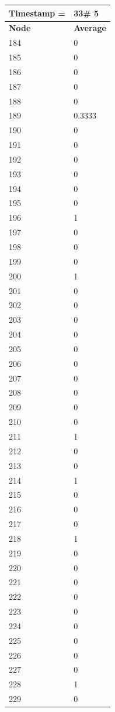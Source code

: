 \begin{tabular}{|l||l|}
\hline
\textbf{Timestamp =} & \textbf{33}\# 5\\\hline
	\textbf{Node} & \textbf{Average} \\ \hline
\hline
	184 & 0 \\ \hline
	185 & 0 \\ \hline
	186 & 0 \\ \hline
	187 & 0 \\ \hline
	188 & 0 \\ \hline
	189 & 0.3333 \\ \hline
	190 & 0 \\ \hline
	191 & 0 \\ \hline
	192 & 0 \\ \hline
	193 & 0 \\ \hline
	194 & 0 \\ \hline
	195 & 0 \\ \hline
	196 & 1 \\ \hline
	197 & 0 \\ \hline
	198 & 0 \\ \hline
	199 & 0 \\ \hline
	200 & 1 \\ \hline
	201 & 0 \\ \hline
	202 & 0 \\ \hline
	203 & 0 \\ \hline
	204 & 0 \\ \hline
	205 & 0 \\ \hline
	206 & 0 \\ \hline
	207 & 0 \\ \hline
	208 & 0 \\ \hline
	209 & 0 \\ \hline
	210 & 0 \\ \hline
	211 & 1 \\ \hline
	212 & 0 \\ \hline
	213 & 0 \\ \hline
	214 & 1 \\ \hline
	215 & 0 \\ \hline
	216 & 0 \\ \hline
	217 & 0 \\ \hline
	218 & 1 \\ \hline
	219 & 0 \\ \hline
	220 & 0 \\ \hline
	221 & 0 \\ \hline
	222 & 0 \\ \hline
	223 & 0 \\ \hline
	224 & 0 \\ \hline
	225 & 0 \\ \hline
	226 & 0 \\ \hline
	227 & 0 \\ \hline
	228 & 1 \\ \hline
	229 & 0 \\ \hline
\end{tabular}
